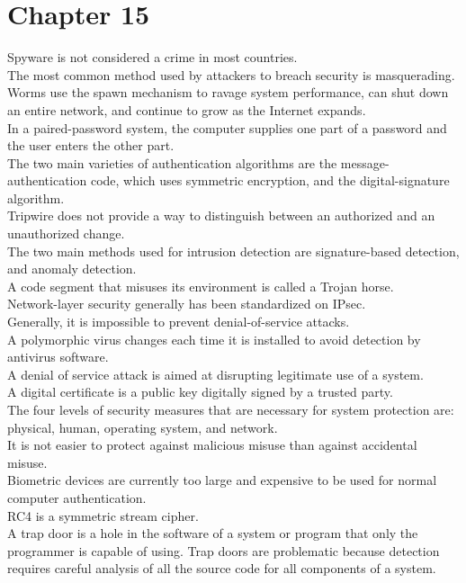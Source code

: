 \documentclass[12pt]{article}
\begin{document}
\section*{\centering Chapter 15}
Spyware is not considered a crime in most countries.\\[2mm]
The most common method used by attackers to breach security is masquerading.\\[2mm]
Worms use the spawn mechanism to ravage system performance, can shut down an entire network, and continue to grow as the Internet expands.\\[2mm]
In a paired-password system, the computer supplies one part of a password and the user enters the other part.\\[2mm]
The two main varieties of authentication algorithms are the message-authentication code, which uses symmetric encryption, and the digital-signature algorithm.\\[2mm]
Tripwire does not provide a way to distinguish between an authorized and an unauthorized change.\\[2mm]
The two main methods used for intrusion detection are signature-based detection, and anomaly detection.\\[2mm]
A code segment that misuses its environment is called a Trojan horse.\\[2mm]
Network-layer security generally has been standardized on IPsec.\\[2mm]
Generally, it is impossible to prevent denial-of-service attacks.\\[2mm]
A polymorphic virus changes each time it is installed to avoid detection by antivirus software.\\[2mm]
A denial of service attack is aimed at disrupting legitimate use of a system.\\[2mm]
A digital certificate is a public key digitally signed by a trusted party.\\[2mm]
The four levels of security measures that are necessary for system protection are: physical, human, operating system, and network.\\[2mm]
It is not easier to protect against malicious misuse than against accidental misuse.\\[2mm]
Biometric devices are currently too large and expensive to be used for normal computer authentication.\\[2mm]
RC4 is a symmetric stream cipher.\\[2mm]
A trap door is a hole in the software of a system or program that only the programmer is capable of using. Trap doors are problematic because detection requires careful analysis of all the source code for all components of a system.\\[2mm]
\end{document}
